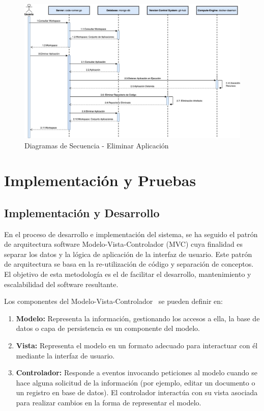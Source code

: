 \documentclass[a4paper,11pt]{book}
\begin{document}
\begin{figure}[H]
\centering
\includegraphics[scale=0.43]{imagenes/secuencia4.jpg}
\caption{ Diagramas de Secuencia - Eliminar Aplicación~\cite{diagrama}  }
\label{s4}
\end{figure}


\chapter{ Implementación y Pruebas}

\section{Implementación y Desarrollo}\label{secid}
En el proceso de desarrollo e implementación del sistema, se ha seguido el patrón de arquitectura software Modelo-Vista-Controlador (MVC) cuya finalidad es separar los datos y la lógica de aplicación de la interfaz de usuario. Este patrón de arquitectura se basa en la re-utilización de código y separación de conceptos. El objetivo de esta metodología es el de facilitar el desarrollo, mantenimiento y escalabilidad del software resultante.


Los componentes del Modelo-Vista-Controlador~\cite{mvc3} se pueden definir en:

\begin{enumerate}
\item \textbf{Modelo:} Representa la información, gestionando los accesos a ella, la base de datos  o capa de persistencia es un componente del modelo.

\item \textbf{Vista:} Representa el modelo en un formato adecuado para interactuar con él mediante la interfaz de usuario.

\item \textbf{Controlador:} Responde a eventos invocando peticiones al modelo cuando se hace alguna solicitud de la información (por ejemplo, editar un documento o un registro en base de datos). El controlador interactúa con su vista asociada para realizar cambios en la forma de representar el modelo.
\end{enumerate}
\end{document}
